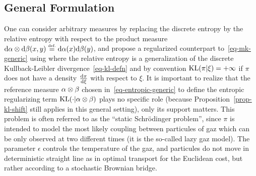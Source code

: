 %







\subsection{General Formulation}

One can consider arbitrary measures by replacing the discrete entropy by the relative entropy with respect to the product measure $\mathrm{d}\alpha\otimes\mathrm{d}\beta(x,y) \stackrel{\mbox{\upshape\tiny def.}}{=} \mathrm{d}\alpha(x)\mathrm{d}\beta(y)$, and propose a regularized counterpart to~\eqref{eq-mk-generic} using
where the relative entropy is a generalization of the discrete Kullback-Leibler divergence~\eqref{eq-kl-defn}
and by convention $\operatorname{KL}(\pi|\xi)=+\infty$ if $\pi$ does not have a density $\frac{\mathrm{d} \pi}{\mathrm{d}\xi}$ with respect to $\xi$. 
%
It is important to realize that the reference measure $\alpha\otimes\beta$ chosen in~\eqref{eq-entropic-generic} to define the entropic regularizing term $\operatorname{KL}(\cdot|\alpha\otimes\beta)$ plays no specific role (because Proposition~\ref{prop-kl-shift} still applies in this general setting), only its support matters.
%
This problem is often referred to as the ``static Schr\"odinger problem'', since $\pi$ is intended to model the most likely coupling between particules of gaz which can be only observed at two different times (it is the so-called lazy gaz model). The parameter $\epsilon$ controls the temperature of the gaz, and particules do not move in deterministic straight line as in optimal transport for the Euclidean cost, but rather according to a stochastic Brownian bridge. 

